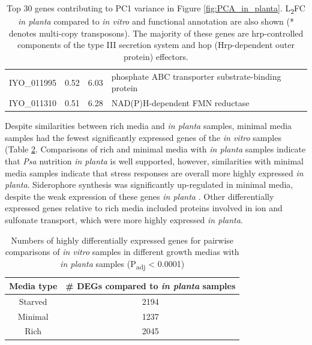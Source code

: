 \begin{table}[H]
\begin{tabular}{cccl}
IYO_011995	& 0.52 & 6.03	& phosphate ABC transporter substrate-binding protein \\
IYO_011310	& 0.51	& 6.28	& NAD(P)H-dependent FMN reductase \\
    \end{tabular}
    \caption[Genes contributing to variance of principal component 1 in \textit{in vitro} and \textit{in planta} transcriptome comparison]{Top 30 genes contributing to PC1 variance in Figure \ref{fig:PCA_in_planta}. L\textsubscript{2}FC \textit{in planta} compared to \textit{in vitro} and functional annotation are also shown (* denotes multi-copy transposons). The majority of these genes are hrp-controlled components of the type III secretion system and hop (Hrp-dependent outer protein) effectors.}
    \label{tab:PCA_in_planta_DEGs}
\end{table}
\newpage
Despite similarities between rich media and \textit{in planta} samples, minimal media samples had the fewest significantly expressed genes of the \textit{in vitro} samples (Table \ref{tab:sig_DEGs_planta}. Comparisons of rich and minimal media with \textit{in planta} samples indicate that \textit{Psa} nutrition \textit{in planta} is well supported, however, similarities with minimal media samples indicate that stress responses are overall more highly expressed \textit{in planta}. Siderophore synthesis was significantly up-regulated in minimal media, despite the weak expression of these genes \textit{in planta} \citep{McAtee2018-sl}. Other differentially expressed genes relative to rich media included proteins involved in ion and sulfonate transport, which were more highly expressed \textit{in planta}.

 \hfill
\begin{table}[H]
    \centering
    \begin{tabular}{cc}\toprule
Media type & \# DEGs  compared to \textit{in planta} samples\\\midrule
Starved  & 2194 \\
Minimal & 1237 \\
Rich  & 2045 \\\bottomrule
    \end{tabular}
    \caption[Numbers of significantly expressed genes for \textit{in vitro} sample comparisons]{Numbers of highly differentially expressed genes for pairwise comparisons of \textit{in vitro} samples in different growth medias with \textit{in planta} samples (P\textsubscript{adj} < 0.0001)	}
    \label{tab:sig_DEGs_planta}
\end{table}

